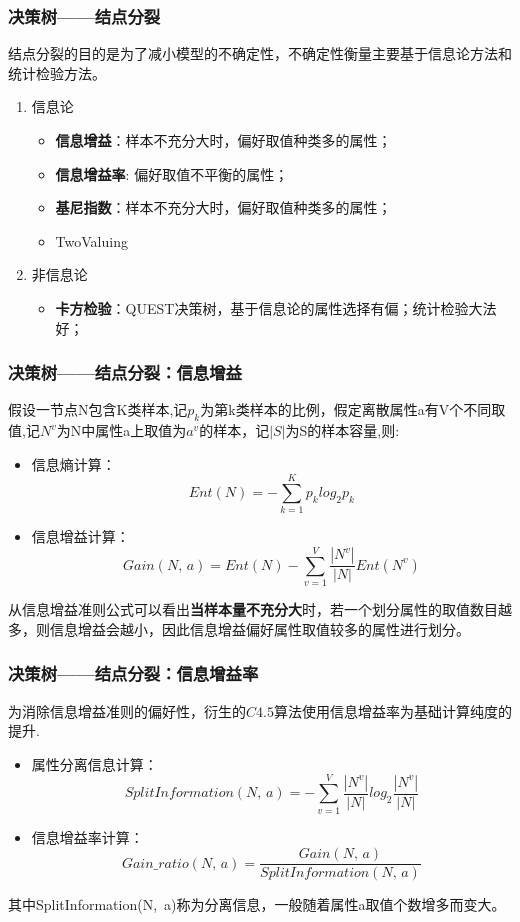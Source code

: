 \documentclass[usenames,dvipsnames]{beamer}
\begin{document}
\begin{frame}
\frametitle{决策树——结点分裂}
结点分裂的目的是为了减小模型的不确定性，不确定性衡量主要基于信息论方法和统计检验方法。
\vskip 0.5cm
\begin{center}
\begin{enumerate}
  \item 信息论\par
    \begin{itemize}
      \item \textbf{信息增益}：样本不充分大时，偏好取值种类多的属性；
      \item \textbf{信息增益率}: 偏好取值不平衡的属性；
      \item \textbf{基尼指数}：样本不充分大时，偏好取值种类多的属性；
      \item TwoValuing
    \end{itemize}
\vskip 0.5cm
  \item 非信息论\par
    \begin{itemize}
      \item \textbf{卡方检验}：QUEST决策树，基于信息论的属性选择有偏；统计检验大法好；
    \end{itemize}
\end{enumerate}
\vskip 0.5cm
\end{center}
\end{frame}
\begin{frame}
\frametitle{决策树——结点分裂：信息增益}
假设一节点N包含K类样本,记$p_k$为第k类样本的比例，假定离散属性a有V个不同取值,记$N^v$为N中属性a上取值为$a^v$的样本，记$|S|$为S的样本容量,则:
\begin{itemize}
\item 信息熵计算：
  $$Ent(N) = -\sum_{k=1}^{K}p_klog_2p_k$$ 
\item 信息增益计算：
  $$Gain(N,\,a) = Ent(N)-\sum_{v=1}^{V}\frac{|N^v|}{|N|}Ent(N^v)$$
\end{itemize}
从信息增益准则公式可以看出\textbf{当样本量不充分大}时，若一个划分属性的取值数目越多，则信息增益会越小，因此信息增益偏好属性取值较多的属性进行划分。
\end{frame}
\begin{frame}
\frametitle{决策树——结点分裂：信息增益率}
为消除信息增益准则的偏好性，衍生的$C4.5$算法使用信息增益率为基础计算纯度的提升.
\begin{itemize}
  \item 属性分离信息计算：
    $$SplitInformation(N,\, a) = - \sum_{v=1}^{V}\frac{|N^v|}{|N|}log_2\frac{|N^v|}{|N|}$$
  \item 信息增益率计算：
    $$Gain\_ratio(N,\,a) = \frac{Gain(N,\,a)}{SplitInformation(N,\, a)}$$
\end{itemize}
其中SplitInformation(N,\, a)称为分离信息，一般随着属性a取值个数增多而变大。
\end{frame}
\end{document}

